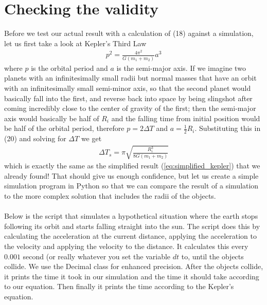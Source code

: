 \documentclass{article}
\begin{document}
\section{Checking the validity}
Before we test our actual result with a calculation of (18) against a simulation, let us first take a look at Kepler's Third Law
\begin{align}
    p^2 = \frac{4\pi^2}{G(m_1 + m_2)} a^3
\end{align}
where $p$ is the orbital period and $a$ is the semi-major axis. If we imagine two planets with an infinitesimally small radii but normal masses that have an orbit with an infinitesimally small semi-minor axis, so that the second planet would basically fall into the first, and reverse back into space by being slingshot after coming incredibly close to the center of gravity of the first; then the semi-major axis would basically be half of $R_i$ and the falling time from initial position would be half of the orbital period, therefore $p = 2\Delta T$ and $a = \frac{1}{2}R_i$. Substituting this in (20) and solving for $\Delta T$ we get
\begin{align}
    \Delta T_{s} =  \pi \sqrt{\frac{R_i^3}{8G(m_1 + m_2)}}
\end{align}
which is exactly the same as the simplified result (\ref{eq:simplified_kepler}) that we already found! That should give us enough confidence, but let us create a simple simulation program in Python so that we can compare the result of a simulation to the more complex solution that includes the radii of the objects.\\
\\
Below is the script that simulates a hypothetical situation where the earth stops following its orbit and starts falling straight into the sun. The script does this by calculating the acceleration at the current distance, applying the acceleration to the velocity and applying the velocity to the distance. It calculates this every $0.001$ second (or really whatever you set the variable $dt$ to, until the objects collide. We use the Decimal class for enhanced precision. After the objects collide, it prints the time it took in our simulation and the time it should take according to our equation. Then finally it prints the time according to the Kepler's equation.
\end{document}
